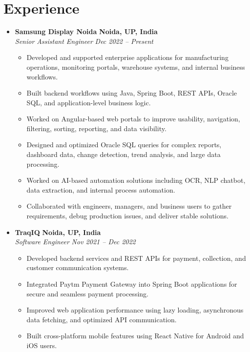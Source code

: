 \documentclass[11pt, a4paper]{article}
\begin{document}
\section*{Experience}
\begin{itemize}[leftmargin=0pt, label={}, itemsep=0.8ex]

    \item
    \textbf{Samsung Display Noida} \hfill \textbf{Noida, UP, India} \\
    \textit{Senior Assistant Engineer} \hfill \textit{Dec 2022 -- Present}
    \begin{itemize}[leftmargin=1.5em]
        \item Developed and supported enterprise applications for manufacturing operations, monitoring portals, warehouse systems, and internal business workflows.
        \item Built backend workflows using Java, Spring Boot, REST APIs, Oracle SQL, and application-level business logic.
        \item Worked on Angular-based web portals to improve usability, navigation, filtering, sorting, reporting, and data visibility.
        \item Designed and optimized Oracle SQL queries for complex reports, dashboard data, change detection, trend analysis, and large data processing.
        \item Worked on AI-based automation solutions including OCR, NLP chatbot, data extraction, and internal process automation.
        \item Collaborated with engineers, managers, and business users to gather requirements, debug production issues, and deliver stable solutions.
    \end{itemize}

    \item
    \textbf{TraqIQ} \hfill \textbf{Noida, UP, India} \\
    \textit{Software Engineer} \hfill \textit{Nov 2021 -- Dec 2022}
    \begin{itemize}[leftmargin=1.5em]
        \item Developed backend services and REST APIs for payment, collection, and customer communication systems.
        \item Integrated Paytm Payment Gateway into Spring Boot applications for secure and seamless payment processing.
        \item Improved web application performance using lazy loading, asynchronous data fetching, and optimized API communication.
        \item Built cross-platform mobile features using React Native for Android and iOS users.
    \end{itemize}


\end{itemize}
\end{document}
